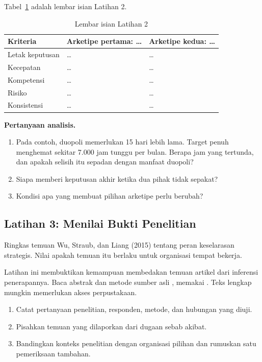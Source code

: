 Tabel~\ref{tab:ch02-lat2-hasil} adalah lembar isian Latihan 2.
\begin{table}[!htb]
  \centering\small
  \caption{Lembar isian Latihan 2}\label{tab:ch02-lat2-hasil}
  \begin{tabularx}{\textwidth}{|>{\raggedright\arraybackslash}p{}|>{\raggedright\arraybackslash}X|>{\raggedright\arraybackslash}X|}
    \hline
    \textbf{Kriteria} & \textbf{Arketipe pertama: \dots} & \textbf{Arketipe kedua: \dots} \\ \hline
    Letak keputusan & \dots & \dots \\ \hline
    Kecepatan & \dots & \dots \\ \hline
    Kompetensi & \dots & \dots \\ \hline
    Risiko & \dots & \dots \\ \hline
    Konsistensi & \dots & \dots \\ \hline
  \end{tabularx}
\end{table}

\textbf{Pertanyaan analisis.}
\begin{enumerate}
  \item Pada contoh, duopoli memerlukan 15 hari lebih lama. Target penuh menghemat sekitar 7.000 jam tunggu
  per bulan. Berapa jam yang tertunda, dan apakah selisih itu sepadan dengan manfaat duopoli?
  \item Siapa memberi keputusan akhir ketika dua pihak tidak sepakat?
  \item Kondisi apa yang membuat pilihan arketipe perlu berubah?
\end{enumerate}

\subsection*{Latihan 3: Menilai Bukti Penelitian}

Ringkas temuan Wu, Straub, dan Liang (2015) tentang peran keselarasan strategis. Nilai apakah temuan itu
berlaku untuk organisasi tempat bekerja.

Latihan ini membuktikan kemampuan membedakan temuan artikel dari inferensi penerapannya. Baca abstrak dan
metode sumber asli \cite{wu2015}, memakai . Teks lengkap
mungkin memerlukan akses perpustakaan.
\begin{enumerate}
  \item Catat pertanyaan penelitian, responden, metode, dan hubungan yang diuji.
  \item Pisahkan temuan yang dilaporkan dari dugaan sebab akibat.
  \item Bandingkan konteks penelitian dengan organisasi pilihan dan rumuskan satu pemeriksaan tambahan.
\end{enumerate}

